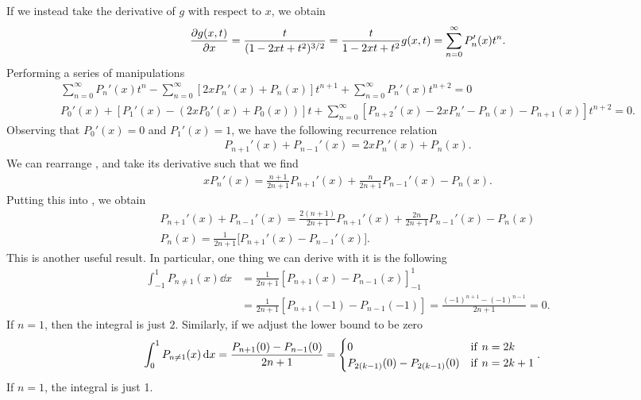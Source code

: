If we instead take the derivative of $g$ with respect to $x$, we obtain
\begin{eqnarray}
    \pdv{g(x,t)}{x} = \frac{t}{(1 - 2xt + t^2)^{3/2}} = \frac{t}{1 - 2xt + t^2} g(x,t) = \sum_{n=0}^{\infty} P_{n}'(x) t^{n}
.\end{eqnarray}
Performing a series of manipulations
\begin{gather}
    \sum_{n=0}^{\infty} P_{n}'(x) t^{n} - \sum_{n=0}^{\infty} [ 2x P_{n}'(x) + P_{n}(x) ] t^{n + 1} + \sum_{n=0}^{\infty} P_{n}'(x) t^{n+2} = 0 \nonumber \\
    P_0'(x) + [ P_1'(x) - ( 2xP_0'(x) + P_0(x) ) ] t + \sum_{n=0}^{\infty} [ P_{n+2}'(x) - 2x P_{n}' - P_{n}(x) - P_{n+1}(x) ] t^{n+2} = 0
.\end{gather}
Observing that $P_0'(x) = 0$ and $P_1'(x) = 1$, we have the following recurrence relation
\begin{eqnarray}
    \label{eq:deriv-rec-relation}
    P_{n+1}'(x) + P_{n-1}'(x) = 2x P_{n}'(x) + P_{n}(x)
.\end{eqnarray}
We can rearrange , and take its derivative such that we find
\begin{eqnarray}
    xP_{n}'(x) = \frac{n+1}{2n+1} P_{n+1}'(x) + \frac{n}{2n+1} P_{n-1}'(x) - P_{n}(x)
.\end{eqnarray}
Putting this into , we obtain
\begin{gather}
    P_{n+1}'(x) + P_{n-1}'(x) = \frac{2(n+1)}{2n+1} P_{n+1}'(x) + \frac{2n}{2n+1}P_{n-1}'(x) - P_{n}(x) \nonumber \\
    P_{n}(x) = \frac{1}{2n+1} \Big[ P_{n+1}'(x) - P_{n-1}'(x) \Big]
.\end{gather}
This is another useful result.
In particular, one thing we can derive with it is the following
\begin{align}
    \int_{-1}^{1} P_{n \ne 1}(x) \dd{x} &= \frac{1}{2n+1} [ P_{n+1}(x) - P_{n-1}(x) ]_{-1}^{1} \nonumber \\
    &= \frac{1}{2n+1} [ P_{n+1}(-1) - P_{n-1}(-1) ] = \frac{(-1)^{n+1} - (-1)^{n-1}}{2n+1} = 0
.\end{align}
If $n = 1$, then the integral is just $2$.
Similarly, if we adjust the lower bound to be zero
\begin{align}
    \int_{0}^{1} P_{n \ne 1}(x) \dd{x} &= \frac{P_{n+1}(0) - P_{n-1}(0)}{2n+1} = \begin{cases}
        0 & {\rm if}~n=2k \\
        P_{2(k-1)}(0) - P_{2(k-1)}(0) & {\rm if}~n=2k+1
    \end{cases}
.\end{align}
If $n = 1$, the integral is just 1.




